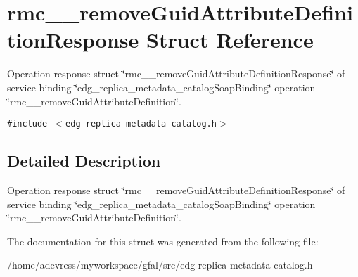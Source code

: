 \section{rmc\_\-\_\-remove\-Guid\-Attribute\-Definition\-Response Struct Reference}
\label{structrmc____removeGuidAttributeDefinitionResponse}
Operation response struct \char`\"{}rmc\_\-\_\-remove\-Guid\-Attribute\-Definition\-Response\char`\"{} of service binding \char`\"{}edg\_\-replica\_\-metadata\_\-catalog\-Soap\-Binding\char`\"{} operation \char`\"{}rmc\_\-\_\-remove\-Guid\-Attribute\-Definition\char`\"{}.  


{\tt \#include $<$edg-replica-metadata-catalog.h$>$}



\subsection{Detailed Description}
Operation response struct \char`\"{}rmc\_\-\_\-remove\-Guid\-Attribute\-Definition\-Response\char`\"{} of service binding \char`\"{}edg\_\-replica\_\-metadata\_\-catalog\-Soap\-Binding\char`\"{} operation \char`\"{}rmc\_\-\_\-remove\-Guid\-Attribute\-Definition\char`\"{}. 



The documentation for this struct was generated from the following file:\begin{CompactItemize}
\item 
/home/adevress/myworkspace/gfal/src/edg-replica-metadata-catalog.h\end{CompactItemize}
